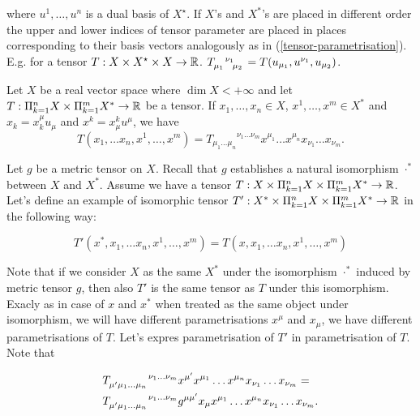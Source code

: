 \documentclass[main.tex]{subfiles}
\begin{document}
where $u^1, \dots, u^n$ is a dual basis of $X^\star$. If $X$'s and $X^*$'s are placed in different order the upper and lower indices of tensor parameter are placed in places corresponding to their basis vectors analogously as in (\ref{tensor-parametrisation}). E.g. for a tensor $T:X\times X^\star\times X\to\mathbb{R}$. 
$\tensor{T}{_{\mu_1}^{\nu_1}_{\mu_2}} = T(u_{\mu_1}, u^{\nu_1}, u_{\mu_2})$.

\begin{corollary}
Let $X$ be a real vector space where $\dim X < +\infty$ and let $T:\Pi_{k=1}^n X \times \Pi_{k=1}^m X^*\to\mathbb{R}$ be a tensor. If $x_1, \dots, x_n\in X$,
$x^1, \dots, x^m\in X^*$ and
$x_k = x^\mu_k u_\mu$ and $x^k = x^k_\mu u^\mu$, we have
\begin{equation}
\label{tensor-param-definition}
T(x_1, \dots x_n, x^1, \dots, x^m) = {T_{\mu_1\dots\mu_n}}^{\nu_1\dots\nu_m} 
x^{\mu_1} \dots x^{\mu_n} x_{\nu_1} \dots x_{\nu_m}.
\end{equation}
\end{corollary}


Let $g$ be a metric tensor on $X$. Recall that $g$ establishes a natural isomorphism $\cdot^*$ between $X$ and $X^*$. Assume we have a tensor $T:X \times \Pi_{k=1}^n X \times \Pi_{k=1}^m X^*\to\mathbb{R}$. Let's define an example of isomorphic tensor $T': X^* \times \Pi_{k=1}^n X \times \Pi_{k=1}^m X^*\to\mathbb{R}$ in the following way: 

\begin{equation}
\label{tensor-isometry}
T'(x^*, x_1, \dots x_n, x^1, \dots, x^m) = T(x, x_1, \dots x_n, x^1, \dots, x^m)
\end{equation}

Note that if we consider $X$ as the same $X^*$ under the isomorphism $\cdot^*$ induced by metric tensor $g$, then also $T'$ is the same tensor as $T$ under this isomorphism. Exacly as in case of $x$ and $x^*$ when treated as the same object under isomorphism, we will have different parametrisations $x^\mu$ and $x_\mu$, we have different parametrisations of $T$. Let's expres parametrisation of $T'$ in parametrisation of $T$. Note that

\begin{align*}
& \tensor{{T}}{_{\mu'}_{\mu_1\dots\mu_n}^{\nu_1\dots\nu_m}} x^{\mu'} x^{\mu_1} \dots x^{\mu_n} x_{\nu_1} \dots x_{\nu_m} = \\
& \tensor{{T}}{_{\mu'}_{\mu_1\dots\mu_n}^{\nu_1\dots\nu_m}} g^{\mu \mu'} x_{\mu} x^{\mu_1} \dots x^{\mu_n} x_{\nu_1} \dots x_{\nu_m}.
\end{align*}
\end{document}
